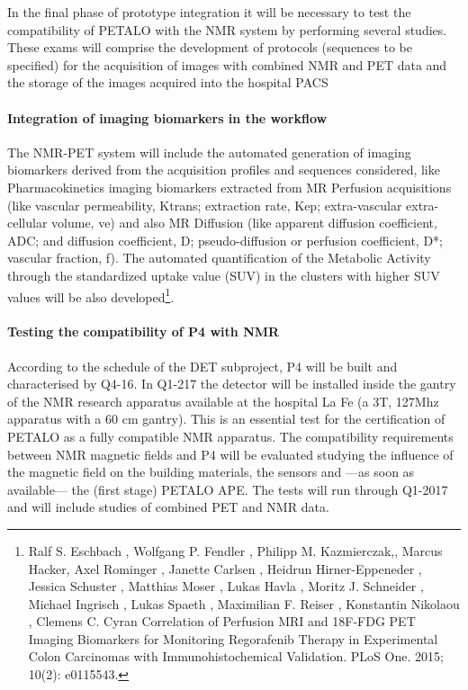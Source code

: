 In the final phase of prototype integration it will be necessary to test the compatibility of PETALO with the NMR system by performing several studies. These exams will comprise the development of protocols (sequences to be specified) for the acquisition of images with combined NMR and PET data and the storage of the images acquired into the hospital PACS

\paragraph{Integration of imaging biomarkers in the workflow}

The NMR-PET system will include the automated generation of imaging biomarkers derived from the acquisition profiles and sequences considered, like Pharmacokinetics imaging biomarkers extracted from MR Perfusion acquisitions (like vascular permeability, Ktrans; extraction rate, Kep; extra-vascular extra-cellular volume, ve) and also MR Diffusion (like apparent diffusion coefficient, ADC; and diffusion coefficient, D; pseudo-diffusion or perfusion coefficient, D*; vascular fraction, f). The automated quantification of the Metabolic Activity through the standardized uptake value (SUV) in the clusters with higher SUV values will be also developed\footnote{Ralf S. Eschbach , Wolfgang P. Fendler , Philipp M. Kazmierczak,, Marcus Hacker, Axel Rominger , Janette Carlsen , Heidrun Hirner-Eppeneder , Jessica Schuster , Matthias Moser , Lukas Havla , Moritz J. Schneider , Michael Ingrisch , Lukas Spaeth , Maximilian F. Reiser , Konstantin Nikolaou , Clemens C. Cyran Correlation of Perfusion MRI and 18F-FDG PET Imaging Biomarkers for Monitoring Regorafenib Therapy in Experimental Colon Carcinomas with Immunohistochemical Validation. PLoS One. 2015; 10(2): e0115543.}.

\paragraph{Testing the compatibility of P4 with NMR}
According to the schedule of the DET subproject, P4 will be built and characterised by Q4-16. In Q1-217 the detector will be installed inside the gantry of the NMR research apparatus available at the hospital La Fe (a 3T, 127Mhz apparatus with a 60 cm gantry). This is an essential test for the certification of PETALO as a fully compatible NMR apparatus. The compatibility requirements between NMR magnetic fields and P4 will be evaluated studying the influence of the magnetic field on the building materials, the sensors and ---as soon as available--- the (first stage) PETALO APE. The tests will run  through Q1-2017 and will include studies of combined PET and NMR data. 

